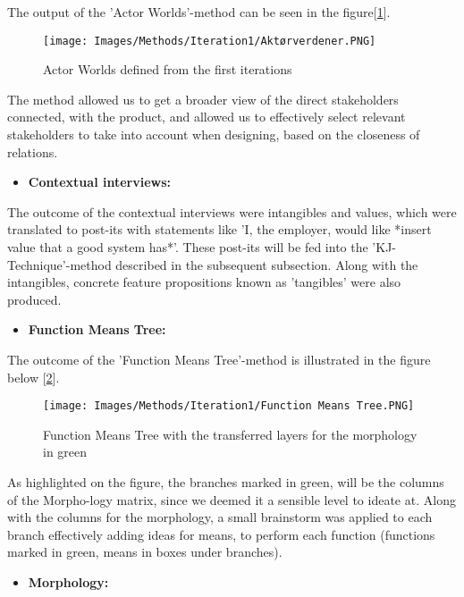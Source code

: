The output of the 'Actor Worlds'-method can be seen in the figure[\ref{Aktørverdener}].

\begin{figure}[H]
\caption{Actor Worlds defined from the first iterations}
\centering
\label{Aktørverdener}
\texttt{[image: Images/Methods/Iteration1/Aktørverdener.PNG]}
\end{figure}

The method allowed us to get a broader view of the direct stakeholders connected, with the product, and allowed us to effectively select relevant stakeholders to take into account when designing, based on the closeness of relations.

\begin{itemize}
    \item \bf{Contextual interviews:}
\end{itemize}

The outcome of the contextual interviews were intangibles and values, which were translated to post-its with statements like 'I, the employer, would like *insert value that a good system has*'. These post-its will be fed into the 'KJ-Technique'-method described in the subsequent subsection. Along with the intangibles, concrete feature propositions known as 'tangibles' were also produced. 

\begin{itemize}
    \item \bf{Function Means Tree:}
\end{itemize}

The outcome of the 'Function Means Tree'-method is illustrated in the figure below [\ref{Tree}].

\begin{figure}[H]
\caption{Function Means Tree with the transferred layers for the morphology in green}
\centering
\label{Tree}
\texttt{[image: Images/Methods/Iteration1/Function Means Tree.PNG]}
\end{figure}

As highlighted on the figure, the branches marked in green, will be the columns of the Morpho-logy matrix, since we deemed it a sensible level to ideate at. Along with the columns for the morphology, a small brainstorm was applied to each branch effectively adding ideas for means, to perform each function (functions marked in green, means in boxes under branches).

\begin{itemize}
    \item \bf{Morphology:}
\end{itemize}


